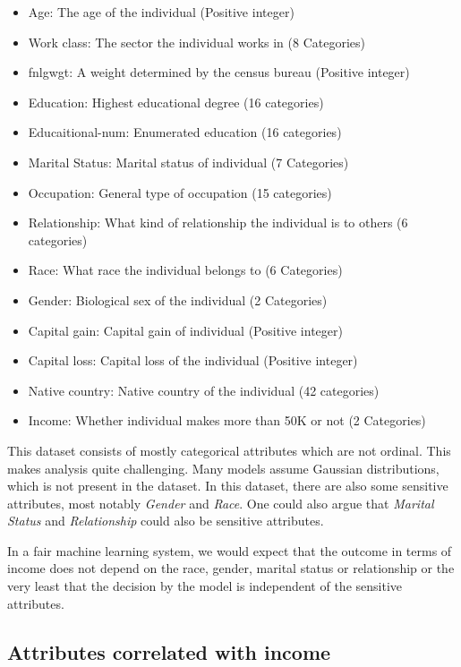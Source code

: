 \begin{itemize}
    \item Age: The age of the individual (Positive integer)
    \item Work class: The sector the individual works in (8 Categories)
    \item fnlgwgt: A weight determined by the census bureau (Positive integer)
    \item Education: Highest educational degree (16 categories)
    \item Educaitional-num: Enumerated education (16 categories)
    \item Marital Status: Marital status of individual (7 Categories)
    \item Occupation: General type of occupation (15 categories)
    \item Relationship: What kind of relationship the individual is to others (6 categories)
    \item Race: What race the individual belongs to (6 Categories)
    \item Gender: Biological sex of the individual (2 Categories)
    \item Capital gain: Capital gain of individual (Positive integer)
    \item Capital loss: Capital loss of the individual (Positive integer)
    \item Native country: Native country of the individual (42 categories)
    \item Income: Whether individual makes more than 50K or not (2 Categories)
\end{itemize}

This dataset consists of mostly categorical attributes which are not ordinal. This makes analysis quite challenging. Many models assume Gaussian distributions, which is not present in the dataset. In this dataset, there are also some sensitive attributes, most notably \emph{Gender} and \emph{Race}. One could also argue that \emph{Marital Status} and \emph{Relationship} could also be sensitive attributes.

In a fair machine learning system, we would expect that the outcome in terms of income does not depend on the race, gender, marital status or relationship or the very least that the decision by the model is independent of the sensitive attributes.

\subsection{Attributes correlated with income}

